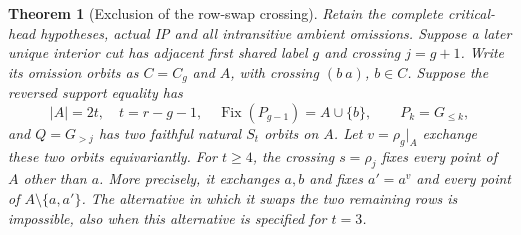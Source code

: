 \documentclass[11pt,a4paper]{article}
\newtheorem{theorem}[lemma]{Theorem}
\begin{document}
\begin{theorem}[Exclusion of the row-swap crossing]
Retain the complete critical-head hypotheses, actual IP and all
intransitive ambient omissions. Suppose a later unique interior
cut has adjacent first shared label $g$ and crossing $j=g+1$.
Write its omission orbits as $C=C_g$ and $A$, with crossing
$(b\ a)$, $b\in C$. Suppose the reversed support equality has
\[
 |A|=2t,\quad t=r-g-1,\quad
 \operatorname{Fix}(P_{g-1})=A\cup\{b\},
 \qquad P_k=G_{\le k},
\]
and $Q=G_{>j}$ has two faithful natural $S_t$ orbits on $A$.
Let $v=\rho_g|_A$ exchange these two orbits equivariantly.
For $t\ge4$, the crossing $s=\rho_j$ fixes every point of
$A$ other than $a$. More precisely, it exchanges $a,b$ and
fixes $a'=a^v$ and every point of $A\setminus\{a,a'\}$.
The alternative in which it swaps the two remaining rows is
impossible, also when this alternative is specified for $t=3$.
\end{theorem}
\end{document}
